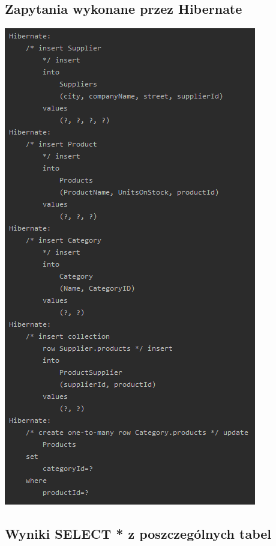 \documentclass[a4paper, 11pt]{article}
\begin{document}
    \subsection{Zapytania wykonane przez Hibernate}
    \begin{center}
        \includegraphics[scale=1.3]{images/point9/hibernateQueries.png}
    \end{center}

    \newpage


    \subsection{Wyniki SELECT * z poszczególnych tabel}
\end{document}
